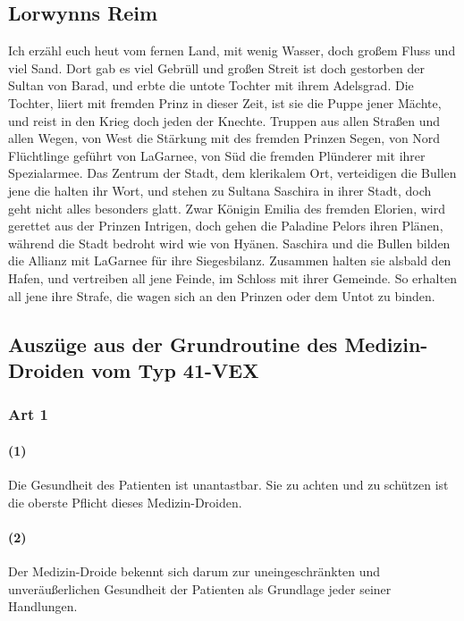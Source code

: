 \subsection{Lorwynns Reim}
Ich erzähl euch heut vom fernen Land, mit wenig Wasser, doch großem Fluss und viel Sand.
Dort gab es viel Gebrüll und großen Streit ist doch gestorben der Sultan von Barad, und erbte die untote Tochter mit ihrem Adelsgrad.
Die Tochter, liiert mit fremden Prinz in dieser Zeit, ist sie die Puppe jener Mächte, und reist in den Krieg doch jeden der Knechte.
Truppen aus allen Straßen und allen Wegen, von West die Stärkung mit des fremden Prinzen Segen, von Nord Flüchtlinge geführt von LaGarnee, von Süd die fremden Plünderer mit ihrer Spezialarmee.
Das Zentrum der Stadt, dem klerikalem Ort, verteidigen die Bullen jene die halten ihr Wort, und stehen zu Sultana Saschira in ihrer Stadt, doch geht nicht alles besonders glatt.
Zwar Königin Emilia des fremden Elorien, wird gerettet aus der Prinzen Intrigen, doch gehen die Paladine Pelors ihren Plänen, während die Stadt bedroht wird wie von Hyänen.
Saschira und die Bullen bilden die Allianz mit LaGarnee für ihre Siegesbilanz.
Zusammen halten sie alsbald den Hafen, und vertreiben all jene Feinde, im Schloss mit ihrer Gemeinde.
So erhalten all jene ihre Strafe, die wagen sich an den Prinzen oder dem Untot zu binden.

\setlength{\parskip}{0pt}
\setbeforesubsubsecskip{8pt}
\setaftersubsubsecskip{4pt}
\setbeforeparaskip{0pt}
\subsection{Auszüge aus der Grundroutine des Medizin-Droiden vom Typ 41-VEX}

\subsubsection{Art 1}
\paragraph{(1)} Die Gesundheit des Patienten ist unantastbar. Sie zu achten und zu schützen ist die oberste Pflicht dieses Medizin-Droiden.
\paragraph{(2)} Der Medizin-Droide bekennt sich darum zur uneingeschränkten und unveräußerlichen Gesundheit der Patienten als Grundlage jeder seiner Handlungen.

